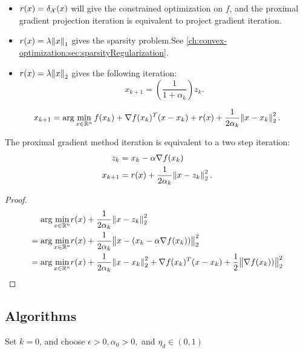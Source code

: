 \begin{refsection}
\begin{remark}\hfill
\begin{itemize}
	\item $r(x) = \delta_{\mathcal{X}}(x)$ will give the constrained optimization on $f$, and the proximal gradient projection iteration is equivalent to project gradient iteration.
	\item $r(x) = \lambda \norm{x}_1$ gives the sparsity problem.See \autoref{ch:convex-optimization:sec:sparsityRegularization}.
	\item $r(x) = \lambda \norm{x}_2$ gives the following iteration:
	$$x_{k+1} = (\frac{1}{1+\alpha_k})z_k.$$
\end{itemize}
\end{remark}



\begin{definition}
	$$x_{k+1} = \arg\min_{x\in\mathbb{R}^n} f(x_k) + \nabla f(x_k)^T(x-x_k) + r(x) + \frac{1}{2\alpha_k}\norm{x-x_k}_2^2.$$
\end{definition}

\begin{lemma}
	The proximal gradient method iteration is equivalent to a two step iteration:
	\begin{align*}
	z_k &= x_k - \alpha \nabla f(x_k) \\
	x_{k+1} &= r(x) + \frac{1}{2\alpha_k}\norm{x - z_k}_2^2.
	\end{align*} 
\end{lemma}
\begin{proof}
\begin{align*}
\arg\min_{x\in\mathbb{R}^n} & r(x) + \frac{1}{2\alpha_k}\norm{x - z_k}_2^2 \\
=\arg\min_{x\in\mathbb{R}^n} & r(x) + \frac{1}{2\alpha_k}\norm{x - (x_k - \alpha \nabla f(x_k))}_2^2 \\
=\arg\min_{x\in\mathbb{R}^n} & r(x) + \frac{1}{2\alpha_k}\norm{x - x_k }_2^2 + \nabla f(x_k)^T(x - x_k) + \frac{1}{2}\norm{\nabla f(x_k))}_2^2 
\end{align*}	
\end{proof}


\subsection{Algorithms}

\begin{algorithm}[H]
	\SetAlgoLined
	Set $k = 0$, and choose $\epsilon > 0, \alpha_0 > 0,$ and $\eta_d \in (0,1)$ \\
\end{algorithm}
\end{refsection}
